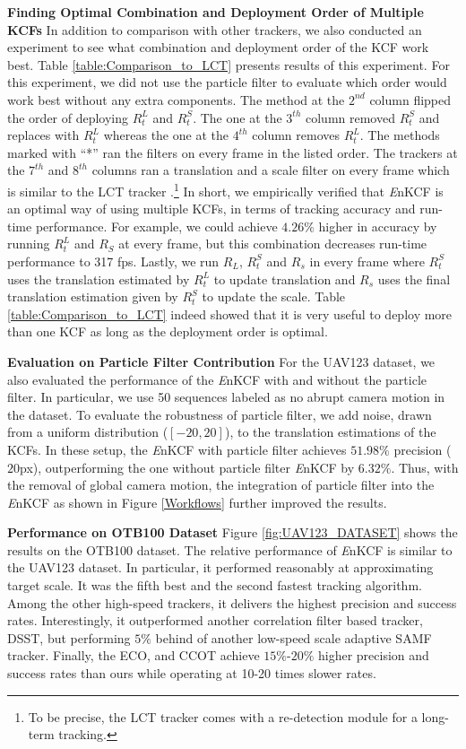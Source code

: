 \documentclass[10pt,twocolumn,letterpaper]{article}
\begin{document}
\textbf{Finding Optimal Combination and Deployment Order of Multiple
  KCFs} In addition to comparison with other trackers, we
also conducted an experiment to see what combination and deployment
order of the KCF work best. Table \ref{table:Comparison_to_LCT}
presents results of this experiment. For this experiment, we did not
use the particle filter to evaluate which order would work best
without any extra components. The method at the $2^{nd}$ column
flipped the order of deploying $R_{t}^{L}$ and $R_{t}^{S}$. The one at
the $3^{th}$ column removed $R_{t}^{S}$ and replaces with $R_{t}^{L}$
whereas the one at the $4^{th}$ column removes $R_{t}^{L}$. The
methods marked with ``*'' ran the filters on every frame in the listed
order. The trackers at the $7^{th}$ and $8^{th}$ columns ran a
translation and a scale filter on every frame which is similar to
the LCT tracker \cite{ma2015long}.\footnote{To be
  precise, the LCT tracker comes with a re-detection module for a
  long-term tracking.} In short, we empirically verified that
\textit{E}nKCF is an optimal way of using multiple KCFs, in terms of
tracking accuracy and run-time performance. For example, we could
achieve $4.26\%$ higher in accuracy by running $R_{t}^{L}$ and $R_{S}$
at every frame, but this combination decreases run-time performance to
317 fps. Lastly, we run $R_{L}$, $R_{t}^{S}$ and $R_{s}$ in every
frame where $R_{t}^{S}$ uses the translation estimated by $R_{t}^{L}$
to update translation and $R_{s}$ uses the final translation
estimation given by $R_{t}^{S}$ to update the scale. Table
\ref{table:Comparison_to_LCT} indeed showed that it is very useful to
deploy more than one KCF as long as the deployment order is optimal.

\textbf{Evaluation on Particle Filter Contribution} For the UAV123
dataset, we also evaluated the performance of the {\it E}nKCF with and
without the particle filter. In particular, we use 50 sequences
labeled as no abrupt camera motion in the dataset. To evaluate the
robustness of particle filter, we add noise, drawn from a uniform
distribution ($[-20,20]$), to the translation estimations of the
KCFs. In these setup, the {\it E}nKCF with particle filter achieves
$51.98\%$ precision ($20$px), outperforming the one without particle
filter {\it E}nKCF by $6.32\%$. Thus, with the removal of global
camera motion, the integration of particle filter into the {\it E}nKCF
as shown in Figure \ref{Workflows} further improved the results.

\textbf{Performance on OTB100 Dataset} Figure \ref{fig:UAV123_DATASET}
shows the results on the OTB100 dataset. The relative performance of
{\it E}nKCF is similar to the UAV123 dataset. In particular, it
performed reasonably at approximating target scale.  It was the fifth
best and the second fastest tracking algorithm. Among the other
high-speed trackers, it delivers the highest precision and success
rates. Interestingly, it outperformed another correlation filter based
tracker, DSST, but performing $5\%$ behind of another low-speed scale
adaptive SAMF tracker. Finally, the ECO, and CCOT achieve
$15\%$-$20\%$ higher precision and success rates than ours while
operating at 10-20 times slower rates.
\end{document}
